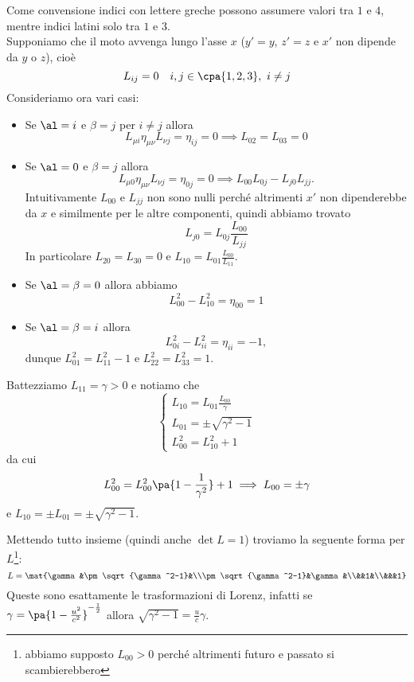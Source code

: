 Come convensione indici con lettere greche possono assumere valori tra $1$ e $4$, mentre indici latini solo tra $1$ e $3$.\\
Supponiamo che il moto avvenga lungo l'asse $x$ ($y'=y$, $z'=z$ e $x'$ non dipende da $y$ o $z$), cio\`e
\[L_{ij}=0 \quad i,j\in\cpa{1,2,3},\ i\neq j\]
Consideriamo ora vari casi:
\begin{itemize}
\item Se $\al=i$ e $\beta=j$ per $i\neq j$ allora
\[L_{\mu i}\eta_{\mu\nu}L_{\nu j}=\eta_{ij}=0\implies L_{02}=L_{03}=0\]
\item Se $\al=0$ e $\beta=j$ allora
\[L_{\mu0}\eta_{\mu\nu}L_{\nu j}=\eta_{0j}=0\implies L_{00}L_{0j}-L_{j0}L_{jj}.\]
Intuitivamente $L_{00}$ e $L_{jj}$ non sono nulli perch\'e altrimenti $x'$ non dipenderebbe da $x$ e similmente per le altre componenti, quindi abbiamo trovato
\[L_{j0}=L_{0j}\frac{L_{00}}{L_{jj}}\]
In particolare $L_{20}=L_{30}=0$ e $L_{10}=L_{01}\frac{L_{00}}{L_{11}}$.
\item Se $\al=\beta=0$ allora abbiamo
\[L_{00}^2-L_{10}^2=\eta_{00}=1\]
\item Se $\al=\beta=i$ allora
\[L_{0i}^2-L_{ii}^2=\eta_{ii}=-1,\]
dunque $L_{01}^2=L_{11}^2-1$ e $L_{22}^2=L_{33}^2=1$.
\end{itemize}
\noindent
Battezziamo $L_{11}=\gamma>0$ e notiamo che
\[\begin{cases}
L_{10}=L_{01}\frac{L_{00}}{\gamma}\\
L_{01}=\pm\sqrt{\gamma^2-1}\\
L^2_{00}=L^2_{10}+1
\end{cases}\]
da cui
\[L_{00}^2=L_{00}^2\pa{1-\frac1{\gamma^2}}+1\implies L_{00}=\pm\gamma\]
e $L_{10}=\pm L_{01}=\pm \sqrt{\gamma^2-1}$.
\medskip

\noindent Mettendo tutto insieme (quindi anche $\det L=1$) troviamo la seguente forma per $L$\footnote{abbiamo supposto $L_{00}>0$ perch\'e altrimenti futuro e passato si scambierebbero}:
\[L=\mat{\gamma &\pm\sqrt{\gamma^2-1}&\\\pm\sqrt{\gamma^2-1}&\gamma&\\&&1&\\&&&1}\]
Queste sono esattamente le trasformazioni di Lorenz, infatti se $\gamma=\pa{1-\frac{u^2}{c^2}}^{-\frac12}$ allora $\sqrt{\gamma^2-1}=\frac uc\gamma$.

